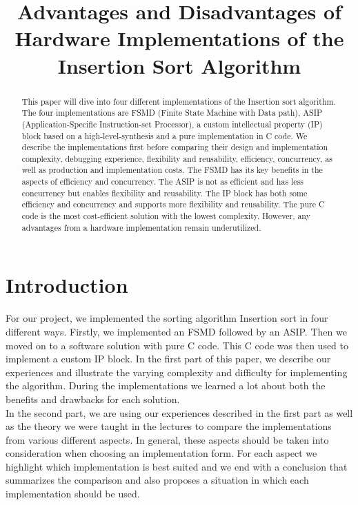 \documentclass[conference]{IEEEtran}
\begin{document}
\title{Advantages and Disadvantages of Hardware Implementations of the Insertion Sort Algorithm}

\author{
\and
{}
\and
{}
}
\maketitle

\begin{abstract}
This paper will dive into four different implementations of the Insertion sort algorithm. The four implementations are FSMD (Finite State Machine with Data path), ASIP (Application-Specific Instruction-set Processor), a custom intellectual property (IP) block based on a high-level-synthesis and a pure implementation in C code. We describe the implementations first before comparing their design and implementation complexity, debugging experience, flexibility and reusability, efficiency, concurrency, as well as production and implementation costs. The FSMD has its key benefits in the aspects of efficiency and concurrency. The ASIP is not as efficient and has less concurrency but enables flexibility and reusability. The IP block has both some efficiency and concurrency and supports more flexibility and reusability. The pure C code is the most cost-efficient solution with the lowest complexity. However, any advantages from a hardware implementation remain underutilized.
\end{abstract}

\section{Introduction}
For our project, we implemented the sorting algorithm Insertion sort in four different ways. Firstly, we implemented an FSMD followed by an ASIP. Then we moved on to a software solution with pure C code. This C code was then used to implement a custom IP block. In the first part of this paper, we describe our experiences and illustrate the varying complexity and difficulty for implementing the algorithm. During the implementations we learned a lot about both the benefits and drawbacks for each solution.\\
In the second part, we are using our experiences described in the first part as well as the theory we were taught in the lectures to compare the implementations from various different aspects. In general, these aspects should be taken into consideration when choosing an implementation form. For each aspect we highlight which implementation is best suited and we end with a conclusion that summarizes the comparison and also proposes a situation in which each implementation should be used.
\end{document}
